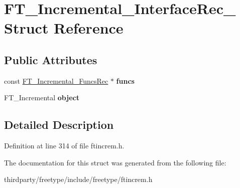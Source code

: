 \hypertarget{struct_f_t___incremental___interface_rec__}{}\section{F\+T\+\_\+\+Incremental\+\_\+\+Interface\+Rec\+\_\+ Struct Reference}
\label{struct_f_t___incremental___interface_rec__}
\subsection*{Public Attributes}
\begin{DoxyCompactItemize}
\item 
\mbox{\label{struct_f_t___incremental___interface_rec___acd254ae2bdd80b4c9218a484c6bc2a41}} 
const \hyperlink{struct_f_t___incremental___funcs_rec__}{F\+T\+\_\+\+Incremental\+\_\+\+Funcs\+Rec} $\ast$ {\bfseries funcs}
\item 
\mbox{\label{struct_f_t___incremental___interface_rec___ae4f527f53465ff84ad01b484fe721a88}} 
F\+T\+\_\+\+Incremental {\bfseries object}
\end{DoxyCompactItemize}


\subsection{Detailed Description}


Definition at line 314 of file ftincrem.\+h.



The documentation for this struct was generated from the following file\+:\begin{DoxyCompactItemize}
\item 
thirdparty/freetype/include/freetype/ftincrem.\+h\end{DoxyCompactItemize}
